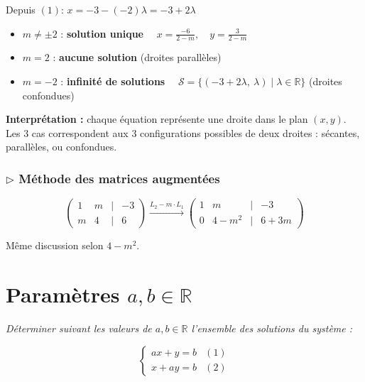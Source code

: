 \documentclass[12pt,a4paper]{article}
\begin{document}
Depuis $(1)$: $x = -3 - (-2)\lambda = -3 + 2\lambda$

\begin{solbox}
\begin{itemize}[noitemsep]
  \item $m \neq \pm 2$ : \textbf{solution unique} $\displaystyle\quad x = \frac{-6}{2-m},\quad y = \frac{3}{2-m}$
  \item $m = 2$ : \textbf{aucune solution} (droites parallèles)
  \item $m = -2$ : \textbf{infinité de solutions} $\quad \mathcal{S} = \{(-3+2\lambda,\ \lambda) \mid \lambda \in \mathbb{R}\}$ (droites confondues)
\end{itemize}

\smallskip
\textbf{Interprétation :} chaque équation représente une droite dans le plan $(x, y)$. Les 3 cas correspondent aux 3 configurations possibles de deux droites : sécantes, parallèles, ou confondues.
\end{solbox}

\subsubsection*{$\triangleright$ Méthode des matrices augmentées}

\[
\begin{pmatrix}
1 & m & \mid & -3 \\
m & 4 & \mid & 6
\end{pmatrix}
\xrightarrow{L_2 - m \cdot L_1}
\begin{pmatrix}
1 & m & \mid & -3 \\
0 & 4-m^2 & \mid & 6+3m
\end{pmatrix}
\]

Même discussion selon $4 - m^2$.

\section{Paramètres $a, b \in \mathbb{R}$}

\textit{Déterminer suivant les valeurs de $a, b \in \mathbb{R}$ l'ensemble des solutions du système :}

\[
\begin{cases}
  ax + y = b & (1)\\
  x + ay = b & (2)
\end{cases}
\]
\end{document}
